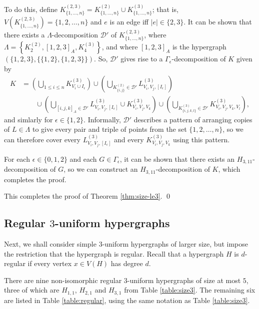 To do this, define $K_{\{1,\ldots,n\}}^{(2,3)} = K_{\{1,\ldots,n\}}^{(2)} \cup K_{\{1,\ldots,n\}}^{(3)}$; that is, $V(K_{\{1,\ldots,n\}}^{(2,3)}) = \{1,2,\ldots,n\}$ and $e$ is an edge iff $|e| \in \{2,3\}$.
It can be shown that there exists a $\Lambda$-decomposition $\mathcal{D}'$ of $K_{\{1,\ldots,n\}}^{(2,3)}$,
where $\Lambda = \left\{ K_{2}^{(2)}, [1,2,3]_A, K_{4}^{(3)} \right\}$, and where $[1,2,3]_A$ is the hypergraph $(\{1,2,3\}, \{\{1,2\},\{1,2,3\}\})$.
So, $\mathcal{D}'$ gives rise to a $\Gamma_\epsilon$-decomposition of $K$ given by
\begin{align*}
    K &= \left( \bigcup_{1 \leq i \leq n} K_{V_i \cup I_\epsilon}^{(3)} \right)
    \cup \left( \bigcup_{K_{\{i,j\}}^{(2)} \in \mathcal{D}'} L_{V_i,V_j,[I_\epsilon]}^{(3)} \right)
    \\ & \quad \quad
    \cup \left( \bigcup_{[i,j,k]_A \in \mathcal{D}'} L_{V_i,V_j,[I_\epsilon]}^{(3)} \cup K_{V_i,V_j,V_k}^{(3)} \right)
    \cup \left( \bigcup_{K_{\{i,j,k,l\}}^{(3)} \in \mathcal{D}'} K_{V_i,V_j,V_k,V_l}^{(3)} \right),
\end{align*}
and simlarly for $\epsilon \in \{1,2\}$.
Informally, $\mathcal{D}'$ describes a pattern of arranging copies of $L \in \Lambda$ to give every pair and triple of points from the set $\{1,2,\ldots,n\}$,
so we can therefore cover every $L_{V_i, V_j, [I_\epsilon]}^{(3)}$ and every $K_{V_i, V_j, V_k}^{(3)}$ using this pattern.

For each $\epsilon \in \{0,1,2\}$ and each $G \in \Gamma_\epsilon$, it can be shown that there exists an $H_{3,11}$-decomposition of $G$,
so we can construct an $H_{3,11}$-decomposition of $K$, which completes the proof.

This completes the proof of Theorem \ref{thm:size-le3}. \qed

\subsection{Regular $3$-uniform hypergraphs}

Next, we shall consider simple $3$-uniform hypergraphs of larger size, but impose the restriction that the hypergraph is regular.
Recall that a hypergraph $H$ is $d$-regular if every vertex $x \in V(H)$ has degree $d$.

There are nine non-isomorphic regular $3$-uniform hypergraphs of size at most $5$, three of which are $H_{1,1}$, $H_{2,1}$ and $H_{3,1}$ from Table \ref{table:size3}.
The remaining six are listed in Table \ref{table:regular}, using the same notation as Table \ref{table:size3}.

